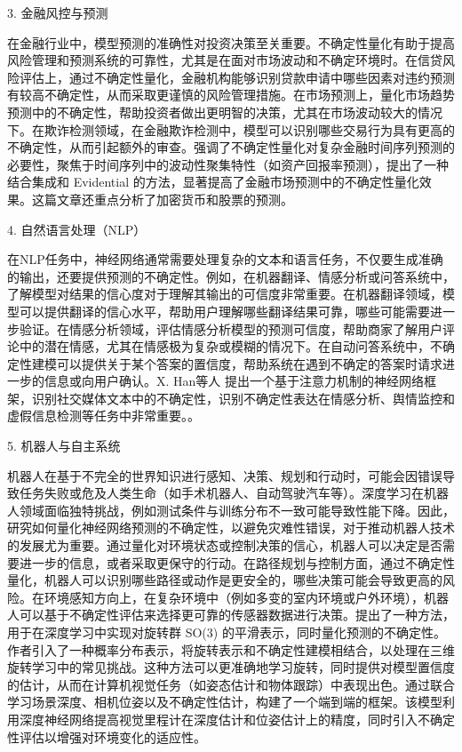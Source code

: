 3. 金融风控与预测

在金融行业中，模型预测的准确性对投资决策至关重要。不确定性量化有助于提高风险管理和预测系统的可靠性，尤其是在面对市场波动和不确定环境时。在信贷风险评估上，通过不确定性量化，金融机构能够识别贷款申请中哪些因素对违约预测有较高不确定性，从而采取更谨慎的风险管理措施。在市场预测上，量化市场趋势预测中的不确定性，帮助投资者做出更明智的决策，尤其在市场波动较大的情况下。在欺诈检测领域，在金融欺诈检测中，模型可以识别哪些交易行为具有更高的不确定性，从而引起额外的审查。\cite{wong2025quantifying}强调了不确定性量化对复杂金融时间序列预测的必要性，聚焦于时间序列中的波动性聚集特性（如资产回报率预测），提出了一种结合集成和 Evidential 的方法，显著提高了金融市场预测中的不确定性量化效果。这篇文章还重点分析了加密货币和股票的预测。

4. 自然语言处理（NLP）

在NLP任务中，神经网络通常需要处理复杂的文本和语言任务，不仅要生成准确的输出，还要提供预测的不确定性。例如，在机器翻译、情感分析或问答系统中，了解模型对结果的信心度对于理解其输出的可信度非常重要。在机器翻译领域，模型可以提供翻译的信心水平，帮助用户理解哪些翻译结果可靠，哪些可能需要进一步验证。在情感分析领域，评估情感分析模型的预测可信度，帮助商家了解用户评论中的潜在情感，尤其在情感极为复杂或模糊的情况下。在自动问答系统中，不确定性建模可以提供关于某个答案的置信度，帮助系统在遇到不确定的答案时请求进一步的信息或向用户确认。X. Han等人\cite{han2019attention} 提出一个基于注意力机制的神经网络框架，识别社交媒体文本中的不确定性，识别不确定性表达在情感分析、舆情监控和虚假信息检测等任务中非常重要。。

5. 机器人与自主系统

机器人在基于不完全的世界知识进行感知、决策、规划和行动时，可能会因错误导致任务失败或危及人类生命（如手术机器人、自动驾驶汽车等）。深度学习在机器人领域面临独特挑战，例如测试条件与训练分布不一致可能导致性能下降。因此，研究如何量化神经网络预测的不确定性，以避免灾难性错误，对于推动机器人技术的发展尤为重要。通过量化对环境状态或控制决策的信心，机器人可以决定是否需要进一步的信息，或者采取更保守的行动。在路径规划与控制方面，通过不确定性量化，机器人可以识别哪些路径或动作是更安全的，哪些决策可能会导致更高的风险。在环境感知方向上，在复杂环境中（例如多变的室内环境或户外环境），机器人可以基于不确定性评估来选择更可靠的传感器数据进行决策。\cite{peretroukhin2020smooth}提出了一种方法，用于在深度学习中实现对旋转群 SO(3) 的平滑表示，同时量化预测的不确定性。作者引入了一种概率分布表示，将旋转表示和不确定性建模相结合，以处理在三维旋转学习中的常见挑战。这种方法可以更准确地学习旋转，同时提供对模型置信度的估计，从而在计算机视觉任务（如姿态估计和物体跟踪）中表现出色。\cite{yang2020d3vo}通过联合学习场景深度、相机位姿以及不确定性估计，构建了一个端到端的框架。该模型利用深度神经网络提高视觉里程计在深度估计和位姿估计上的精度，同时引入不确定性评估以增强对环境变化的适应性。


